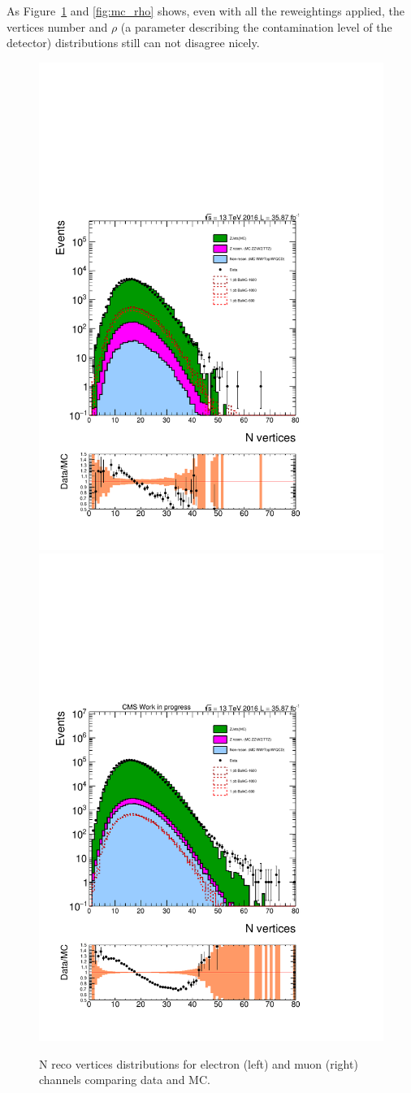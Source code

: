 As Figure~\ref{fig:mc_nvtx} and \ref{fig:mc_rho} shows, even with all the reweightings applied, the vertices number and $\rho$ (a parameter describing the contamination level of the detector) distributions still can not disagree nicely.
\begin{figure}[htbp!]
\centering
\includegraphics[width=0.46\linewidth, page=1]{figures/ReMiniSummer16_MC_GMCPhPtWt_tightzpt50_puWeightsummer16_metfilter_unblind_el_log_1pb.pdf}
\includegraphics[width=0.46\linewidth, page=1]{figures/ReMiniSummer16_MC_GMCPhPtWt_tightzpt50_puWeightsummer16_metfilter_unblind_mu_log_1pb.pdf}
\caption{N reco vertices distributions for electron (left) and muon (right) channels comparing data and MC.}
\label{fig:mc_nvtx}
\end{figure}

